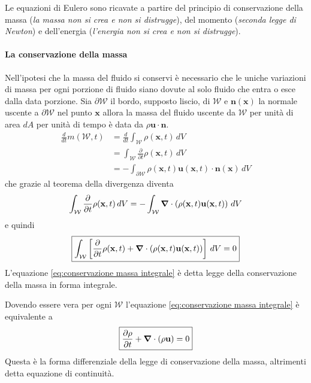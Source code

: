 Le equazioni di Eulero sono ricavate a partire del principio di conservazione della massa (\emph{la massa non si crea e non si distrugge}), del momento (\emph{seconda legge di Newton}) e dell'energia (\emph{l'energia non si crea e non si distrugge}).

\paragraph{La conservazione della massa}
Nell'ipotesi che la massa del fluido si conservi è necessario che le uniche variazioni di massa per ogni porzione di fluido siano dovute al solo fluido che entra o esce dalla data porzione. Sia $\partial \mathcal{W}$ il bordo, supposto liscio, di  $\mathcal{W}$ e $\mathbf{n}(\mathbf{x})$ la normale uscente a $\partial \mathcal{W}$ nel punto $\mathbf{x}$ allora la massa del fluido uscente da $\mathcal{W}$ per unità di area $dA$ per unità di tempo è data da $\rho \mathbf{u}\cdot \mathbf{n}$.
\begin{equation*}  
\begin{split}
\frac{d}{dt} m(\mathcal{W},t) &= \frac{d}{dt}  \int_{\mathcal{W}}\rho(\mathbf{x},t) \, dV \\
                              &= \int_{\mathcal{W}}\frac{\partial}{\partial t}\rho(\mathbf{x},t) \, dV \\
                              &= - \int_{\partial \mathcal{W}}\rho(\mathbf{x},t) \mathbf{u}(\mathbf{x},t) \cdot \mathbf{n}(\mathbf{x}) \, dV
\end{split}
\end{equation*}
che grazie al teorema della divergenza diventa
\begin{equation*}
\int_{\mathcal{W}}\frac{\partial}{\partial t}\rho(\mathbf{x},t) \, dV = -\int_{\mathcal{W}}\boldsymbol{\nabla} \cdot \left (\rho(\mathbf{x},t) \mathbf{u}(\mathbf{x},t) \right ) \, dV
\end{equation*}
e quindi
\begin{equation}\label{eq:conservazione massa integrale}
\boxed{
\int_{\mathcal{W}}\left [ \frac{\partial}{\partial t}\rho(\mathbf{x},t) + \boldsymbol{\nabla} \cdot (\rho(\mathbf{x},t) \mathbf{u}(\mathbf{x},t)) \right ]\, dV = 0
}
\end{equation}
L'equazione \ref{eq:conservazione massa integrale} è detta legge della conservazione della massa in forma integrale.

Dovendo essere vera per ogni $\mathcal{W}$ l'equazione \ref{eq:conservazione massa integrale} è equivalente a 
\begin{equation}\label{eq:conservazione massa differenziale}
\boxed{
\frac{\partial \rho}{\partial t} + \boldsymbol{\nabla} \cdot (\rho \mathbf{u}) = 0
}
\end{equation}
Questa è la forma differenziale della legge di conservazione della massa, altrimenti detta equazione di continuità.

